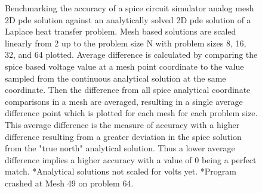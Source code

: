 \begin{figure}
\centering{}
\caption{Benchmarking the accuracy of a spice circuit simulator analog mesh 2D \acrshort{pde} solution against an analytically solved 2D \acrshort{pde} solution of a Laplace heat transfer problem. Mesh based solutions are scaled linearly from 2 up to the problem size N with problem sizes 8, 16, 32, and 64  plotted. Average difference is calculated by comparing the spice based voltage value at a mesh point coordinate to the value sampled from the continuous analytical solution at the same coordinate. Then the difference from all \acrfull{spice} analytical coordinate comparisons in a mesh are averaged, resulting in a single average difference point which is plotted for each mesh for each problem size. This average difference is the measure of accuracy with a higher difference resulting from a greater deviation in the spice solution from the "true north" analytical solution. Thus a lower average difference implies a higher accuracy with a value of 0 being a perfect match. *Analytical solutions not scaled for volts yet. *Program crashed at Mesh 49 on problem 64.}
\label{electricalAnalyticalDiff}
\end{figure}
